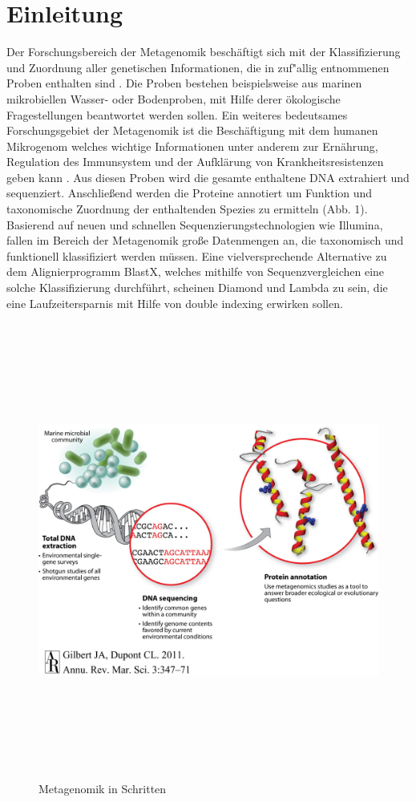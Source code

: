 \documentclass[10pt, a4paper]{article}[08.12.2015]
\begin{document}
   \section{Einleitung}
    Der Forschungsbereich der Metagenomik besch\"aftigt sich mit der Klassifizierung und Zuordnung aller genetischen Informationen, die in zuf"allig entnommenen Proben enthalten sind \cite{handelsman1998}. Die Proben bestehen beispielsweise aus marinen mikrobiellen Wasser- oder Bodenproben, mit Hilfe derer \"okologische Fragestellungen beantwortet werden sollen. Ein weiteres bedeutsames Forschungsgebiet der Metagenomik ist die Besch\"aftigung mit dem humanen Mikrogenom welches wichtige Informationen unter anderem zur Ern\"ahrung, Regulation des Immunsystem und der Aufkl\"arung von Krankheitsresistenzen geben kann \cite{dethlefsen2008}. Aus diesen Proben wird die gesamte enthaltene DNA extrahiert und sequenziert. Anschlie{\ss}end werden die Proteine annotiert um Funktion und taxonomische Zuordnung der enthaltenden Spezies zu ermitteln (Abb. 1).
    Basierend auf neuen und schnellen Sequenzierungstechnologien wie Illumina, fallen im Bereich der Metagenomik gro{\ss}e Datenmengen an, die taxonomisch und funktionell klassifiziert werden m\"ussen. Eine vielversprechende Alternative zu dem Alignierprogramm BlastX, welches mithilfe von Sequenzvergleichen eine solche Klassifizierung durchf\"uhrt, scheinen Diamond \cite{buchfink2014} und Lambda \cite{hauswedell2014} zu sein, die eine Laufzeitersparnis mit Hilfe von double indexing erwirken sollen.
    \newline
    \begin{figure}[H]
\centering
      \noindent\includegraphics[width=\linewidth,height=15cm,
      keepaspectratio]{Abbildungen/metagenome-steps.jpg}
      \caption{Metagenomik in Schritten}
\end{figure}
   
\end{document}
